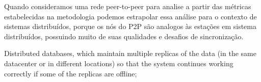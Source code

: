 Quando consideramos uma rede peer-to-peer para analise a partir das métricas estabelecidas na metodologia podemos estrapolar essa análise para o contexto de sistemas distribuídos, porque os nós do P2P são analogos às estações em sistema distribuídos, possuindo muito de suas qualidades e desafios de sincronização.

Distributed databases, which maintain multiple replicas of the data (in the same datacenter or in different locations) so that the system continues working correctly if some of the replicas are offline;
